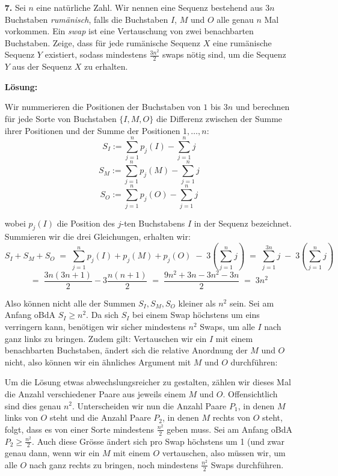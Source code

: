 \documentclass[language=german,style=solution]{smo}
\begin{document}
\begin{enumerate}
\newpage

\item[\textbf{7.}] %
Sei $n$ eine natürliche Zahl. Wir nennen eine Sequenz bestehend aus $3n$ Buchstaben \emph{rumänisch}, falls die Buchstaben $I$, $M$ und $O$ alle genau $n$ Mal vorkommen. Ein \emph{swap} ist eine Vertauschung von zwei benachbarten Buchstaben. Zeige, dass für jede rumänische Sequenz $X$ eine rumänische Sequenz $Y$ existiert, sodass mindestens $\frac{3n^2}{2}$ swaps nötig sind, um die Sequenz $Y$ aus der Sequenz $X$ zu erhalten.

\textbf{Lösung:}

Wir nummerieren die Positionen der Buchstaben von $1$ bis $3n$ und berechnen für jede Sorte von Buchstaben $\{I,M,O\}$ die Differenz zwischen der Summe ihrer Positionen und der Summe der Positionen $1, \dots , n$:
\[
S_I := \sum_{j=1}^n{p_j(I)} - \sum_{j=1}^n{j}
\]
\[
S_M := \sum_{j=1}^n{p_j(M)} - \sum_{j=1}^n{j}
\]
\[
S_O := \sum_{j=1}^n{p_j(O)} - \sum_{j=1}^n{j}
\]

wobei $p_j(I)$ die Position des $j$-ten Buchstabens $I$ in der Sequenz bezeichnet. Summieren wir die drei Gleichungen, erhalten wir:
\[
S_I+S_M+S_O \; = \; \sum_{j=1}^n{p_j(I)+p_j(M)+p_j(O)} \; - \; 3(\sum_{j=1}^n{j}) \; = \; \sum_{j=1}^{3n}{j} \; - \; 3(\sum_{j=1}^n{j}) \]
\[
= \; \frac{3n(3n+1)}{2} - 3\frac{n(n+1)}{2} \; = \; \frac{9n^2 + 3n - 3n^2 - 3n}{2} \; = \; 3n^2
\]

Also können nicht alle der Summen $S_I, S_M, S_O$ kleiner als $n^2$ sein. Sei am Anfang oBdA $S_I \geq n^2$. Da sich $S_I$ bei einem Swap höchstens um eins verringern kann, benötigen wir sicher mindestens $n^2$ Swaps, um alle $I$ nach ganz links zu bringen. Zudem gilt: Vertauschen wir ein $I$ mit einem benachbarten Buchstaben, ändert sich die relative Anordnung der $M$ und $O$ nicht, also können wir ein ähnliches Argument mit $M$ und $O$ durchführen:

Um die Lösung etwas abwechslungsreicher zu gestalten, zählen wir dieses Mal die Anzahl verschiedener Paare aus jeweils einem $M$ und $O$. Offensichtlich sind dies genau $n^2$. Unterscheiden wir nun die Anzahl Paare $P_1$, in denen $M$ links von $O$ steht und die Anzahl Paare $P_2$, in denen $M$ rechts von $O$ steht, folgt, dass es von einer Sorte mindestens $\frac{n^2}{2}$ geben muss. Sei am Anfang oBdA $P_2 \geq \frac{n^2}{2}$. Auch diese Grösse ändert sich pro Swap höchstens um 1 (und zwar genau dann, wenn wir ein $M$ mit einem $O$ vertauschen, also müssen wir, um alle $O$ nach ganz rechts zu bringen, noch mindestens $\frac{n^2}{2}$ Swaps durchführen.


\end{enumerate}
\end{document}
